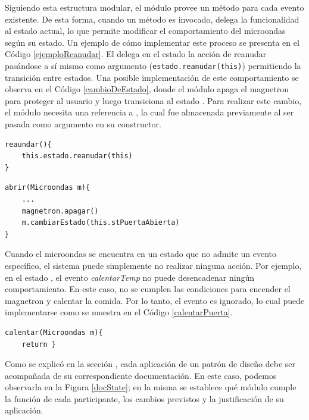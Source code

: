 Siguiendo esta estructura modular, el módulo \Microondas provee un método para cada evento existente. De esta forma, cuando un método es invocado, delega la funcionalidad al estado actual, lo que permite modificar el comportamiento del microondas según su estado. Un ejemplo de cómo implementar este proceso se presenta en el Código \ref{ejemploReanudar}. El \Microondas delega en el estado la acción de reanudar pasándose a sí mismo como argumento (\verb|estado.reanudar(this)|) permitiendo la transición entre estados. Una posible implementación de este comportamiento se observa en el Código \ref{cambioDeEstado}, donde el módulo \Calentando apaga el \gls{magnetron} para proteger al usuario y luego transiciona al estado \PuertaAbierta. Para realizar este cambio, el módulo \Calentando necesita una referencia a \PuertaAbierta, la cual fue almacenada previamente al ser pasada como argumento en su constructor.

\begin{lstlisting}[caption=Ejemplo de implementación método reaundar del módulo \Microondas, label=ejemploReanudar]
reaundar(){
    this.estado.reanudar(this)
}
\end{lstlisting}
\begin{lstlisting}[caption=Ejemplo de implementación método abrir del módulo \Calentando, label=cambioDeEstado]
abrir(Microondas m){
    ...
    magnetron.apagar()
    m.cambiarEstado(this.stPuertaAbierta)
}
\end{lstlisting}

Cuando el microondas se encuentra en un estado que no admite un evento específico, el sistema puede simplemente no realizar ninguna acción. Por ejemplo, en el estado \PuertaAbierta, el evento \textit{calentarTemp} no puede desencadenar ningún comportamiento. En este caso, no se cumplen las condiciones para encender el \gls{magnetron} y calentar la comida. Por lo tanto, el evento es ignorado, lo cual puede implementarse como se muestra en el Código \ref{calentarPuerta}.
\begin{lstlisting}[caption=Ejemplo de implementación método calentar del módulo \PuertaAbierta, label=calentarPuerta]
calentar(Microondas m){
    return }
\end{lstlisting}

Como se explicó en la sección , cada aplicación de un patrón de diseño debe ser acompañada de su correspondiente documentación. En este caso, podemos observarla en la Figura \ref{docState}; en la misma se establece qué módulo cumple la función de cada participante, los cambios previstos y la justificación de su aplicación.


